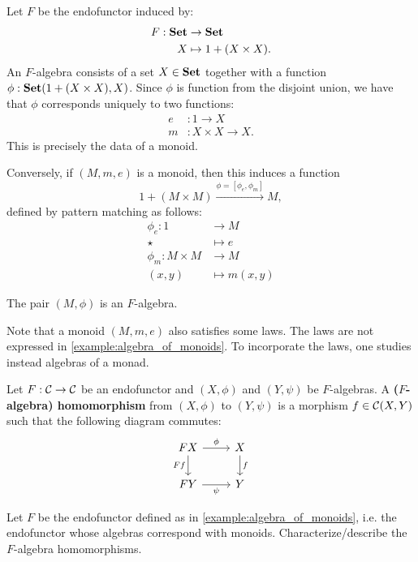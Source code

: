 \begin{exa}\label{example:algebra_of_monoids} Let $F$ be the endofunctor induced by:
\begin{align*}
  F: \mathbf{Set} &\to \mathbf{Set}
  \\
  X &\mapsto 1 + (X\times X).
\end{align*}
An $F$-algebra consists of a set $X\in\mathbf{Set}$ together with a function $\phi:{\mathbf{Set}}(1 + (X\times X),X)$. Since $\phi$ is function from the disjoint union, we have that $\phi$ corresponds uniquely to two functions:
\begin{align*}
e &: 1\to X
\\
m &: X\times X\to X.
\end{align*}
This is precisely the data of a monoid.

Conversely, if $(M,m,e)$ is a monoid, then this induces a function
\[
1 + (M\times M) \xrightarrow{\phi = [\phi_e,\phi_m]} M,
\]
defined by pattern matching as follows:
\begin{align*}
\phi_e : 1 &\to M
\\
\star &\mapsto e
\\
\phi_m : M\times M &\to M 
\\
(x,y) &\mapsto m(x,y)
\end{align*}

The pair $(M, \phi)$ is an $F$-algebra.

\end{exa}

\begin{rem}
 Note that a monoid $(M,m,e)$ also satisfies some laws.
 The laws are not expressed in \cref{example:algebra_of_monoids}.
 To incorporate the laws, one studies instead algebras of a monad.
\end{rem}


\begin{dfn}\label{dfn:alg-hom}
Let $F:\mathcal{C}\to \mathcal{C}$ be an endofunctor and $(X,\phi)$ and $(Y,\psi)$ be $F$-algebras. 
A \textbf{($F$-algebra) homomorphism} from $(X,\phi)$ to $(Y,\psi)$ is a morphism $f\in {\mathcal{C}}(X,Y)$ such that the following diagram commutes:
\[
\begin{tikzcd}
FX
\arrow[r, "\phi"] 
\arrow[d,swap, "Ff"]
& X
\arrow[d, "f"] 
\\
FY
\arrow[r, swap, "\psi"] 
& Y
\end{tikzcd}
\]
\end{dfn}



\begin{exer} 
Let $F$ be the endofunctor defined as in \cref{example:algebra_of_monoids}, 
i.e. the endofunctor whose algebras correspond with monoids. 
Characterize/describe the $F$-algebra homomorphisms.
\end{exer}

